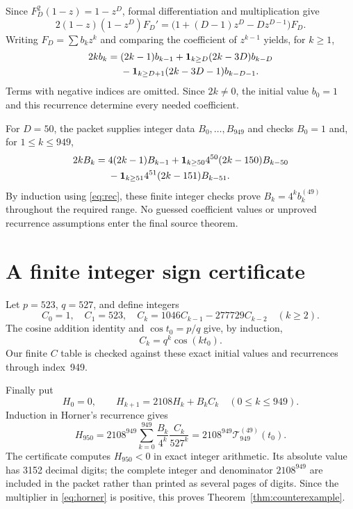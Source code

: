 \documentclass[11pt]{article}
\begin{document}
Since $F_D^2(1-z)=1-z^D$, formal differentiation and multiplication give
\begin{equation}\label{eq:ode}
 2(1-z)(1-z^D)F_D'
   =\bigl(1+(D-1)z^D-Dz^{D-1}\bigr)F_D.
\end{equation}
Writing $F_D=\sum b_kz^k$ and comparing the coefficient of $z^{k-1}$
yields, for $k\geq1$,
\begin{align}\label{eq:rec}
 2k b_k={}&(2k-1)b_{k-1}
  +\mathbf1_{k\geq D}(2k-3D)b_{k-D}\notag\\
 &-\mathbf1_{k\geq D+1}(2k-3D-1)b_{k-D-1}.
\end{align}
Terms with negative indices are omitted. Since $2k\ne0$, the initial
value $b_0=1$ and this recurrence determine every needed coefficient.

For $D=50$, the packet supplies integer data $B_0,\ldots,B_{949}$ and
checks $B_0=1$ and, for $1\leq k\leq949$,
\begin{align}\label{eq:intrec}
 2k B_k={}&4(2k-1)B_{k-1}
   +\mathbf1_{k\geq50}4^{50}(2k-150)B_{k-50}\notag\\
 &-\mathbf1_{k\geq51}4^{51}(2k-151)B_{k-51}.
\end{align}
By induction using \eqref{eq:rec}, these finite integer checks prove
$B_k=4^k b_k^{(49)}$ throughout the required range. No guessed
coefficient values or unproved recurrence assumptions enter the final
source theorem.

\section{A finite integer sign certificate}
Let $p=523$, $q=527$, and define integers
\[
 C_0=1,\quad C_1=523,\quad
 C_k=1046C_{k-1}-277729C_{k-2}\quad(k\geq2).
\]
The cosine addition identity and $\cos t_0=p/q$ give, by induction,
\[
 C_k=q^k\cos(kt_0).
\]
Our finite $C$ table is checked against these exact initial values and
recurrences through index~949.

Finally put
\[
 H_0=0,\qquad H_{k+1}=2108H_k+B_kC_k\quad(0\leq k\leq949).
\]
Induction in Horner's recurrence gives
\begin{equation}\label{eq:horner}
 H_{950}=2108^{949}\sum_{k=0}^{949}
       \frac{B_k}{4^k}\frac{C_k}{527^k}
       =2108^{949}\mathcal T_{949}^{(49)}(t_0).
\end{equation}
The certificate computes $H_{950}<0$ in exact integer arithmetic. Its
absolute value has 3152 decimal digits; the complete integer and
denominator $2108^{949}$ are included in the packet rather than printed
as several pages of digits. Since the multiplier in \eqref{eq:horner}
is positive, this proves Theorem~\ref{thm:counterexample}.
\end{document}
